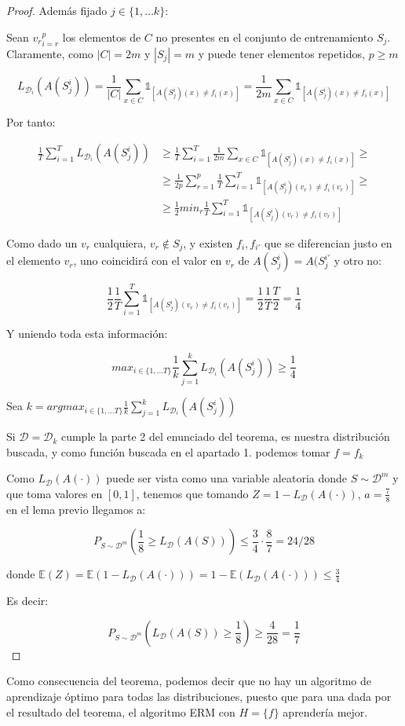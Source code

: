 \begin{proof}
Además fijado $j \in \{1,\ldots k\}$:

Sean ${v_r}_{i=r}^p$ los elementos de $C$ no presentes en el conjunto de entrenamiento $S_j$. Claramente, como $|C|=2m$ y $|S_j| = m$ y puede tener elementos repetidos, $p \ge m$

\[L_{\mathcal{D}_i} (A(S^i_j)) = \frac{1}{|C|} \sum_{x\in C} \mathds{1}_{[A(S^i_j)(x) \neq f_i(x)]} = \frac{1}{2m} \sum_{x \in C} \mathds{1}_{[A(S^i_j)(x) \neq f_i(x)]}\]


Por tanto:

\begin{align*}
\frac{1}{T} \sum_{i=1}^{T}  L_{\mathcal{D}_i} (A(S_j^i)) &\ge
\frac{1}{T} \sum_{i=1}^{T}  \frac{1}{2m} \sum_{x \in C} \mathds{1}_{[A(S^i_j)(x) \neq f_i(x)]} \ge \\
&\ge \frac{1}{2p} \sum_{r=1}^p \frac{1}{T} \sum_{i=1}^{T}  \mathds{1}_{[A(S^i_j)(v_r) \neq f_i(v_r)]} \ge \\
&\ge \frac{1}{2} min_{r} \frac{1}{T} \sum_{i=1}^{T}  \mathds{1}_{[A(S^i_j)(v_r) \neq f_i(v_r)]}
\end{align*}


Como dado un $v_r$ cualquiera, $v_r \notin S_j$, y existen $f_i, f_{i'}$ que se diferencian justo en el elemento $v_r$, uno coincidirá con el valor en $v_r$ de $A(S_{j}^i) = A(S_{j}^{i'}$ y otro no:

\[\frac{1}{2} \frac{1}{T} \sum_{i=1}^{T}  \mathds{1}_{[A(S^i_j)(v_r) \neq f_i(v_r)]} = \frac{1}{2} \frac{1}{T} \frac{T}{2} = \frac{1}{4}\]

Y uniendo toda esta información:

\[max_{i \in \{1,\ldots T\}} \frac{1}{k} \sum_{j=1}^{k} L_{\mathcal{D}_i} (A(S_j^i)) \ge \frac{1}{4}\]

Sea $k = argmax_{i \in \{1,\ldots T\}} \frac{1}{k} \sum_{j=1}^{k} L_{\mathcal{D}_i} (A(S_j^i))$

Si $\mathcal{D} = \mathcal{D}_k$ cumple la parte 2 del enunciado del teorema, es nuestra distribución buscada, y como función buscada en el apartado 1. podemos tomar $f=f_k$

Como $L_{\mathcal{D}} (A(\cdot))$ puede ser vista como una variable aleatoria donde $S \sim \mathcal{D}^m$ y que toma valores en $[0,1]$, tenemos que tomando $Z = 1-L_{\mathcal{D}}(A(\cdot))$, $a=\frac{7}{8}$ en el lema previo llegamos a:

\[P_{S\sim \mathcal{D}^m} \left(\frac{1}{8} \ge L_{\mathcal{D}}(A(S)) \right) \le \frac{3}{4} \cdot \frac{8}{7} = 24/28\]

donde $\mathbb{E}(Z) = \mathbb{E} (1 - L_{\mathcal{D}}(A(\cdot))) = 1 - \mathbb{E} (L_{\mathcal{D}}(A(\cdot))) \le \frac{3}{4}$

Es decir:

\[P_{S\sim \mathcal{D}^m} \left( L_{\mathcal{D}}(A(S)) \ge \frac{1}{8} \right) \ge \frac{4}{28} = \frac{1}{7}\]
\end{proof}


Como consecuencia del teorema, podemos decir que no hay un algoritmo de aprendizaje óptimo para todas las distribuciones, puesto que para una dada por el resultado del teorema, el algoritmo ERM con $H = \{f\}$ aprendería mejor.
